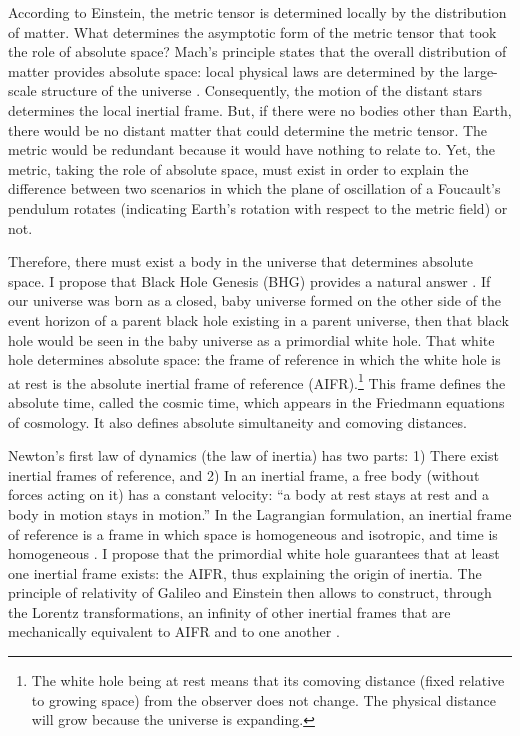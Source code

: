 \documentclass[prl,twocolumn,nofootinbib]{revtex4}
\begin{document}
According to Einstein, the metric tensor is determined locally by the distribution of matter.
What determines the asymptotic form of the metric tensor that took the role of absolute space?
Mach's principle states that the overall distribution of matter provides absolute space: local physical laws are determined by the large-scale structure of the universe \cite{Mach}.
Consequently, the motion of the distant stars determines the local inertial frame.
But, if there were no bodies other than Earth, there would be no distant matter that could determine the metric tensor.
The metric would be redundant because it would have nothing to relate to.
Yet, the metric, taking the role of absolute space, must exist in order to explain the difference between two scenarios in which the plane of oscillation of a Foucault’s pendulum rotates (indicating Earth's rotation with respect to the metric field) or not.

Therefore, there must exist a body in the universe that determines absolute space.
I propose that Black Hole Genesis (BHG) provides a natural answer \cite{ApJ}.
If our universe was born as a closed, baby universe \cite{BHG} formed on the other side of the event horizon of a parent black hole existing in a parent universe, then that black hole would be seen in the baby universe as a primordial white hole.
That white hole determines absolute space: the frame of reference in which the white hole is at rest is the absolute inertial frame of reference (AIFR).\footnote{
The white hole being at rest means that its comoving distance (fixed relative to growing space) from the observer does not change.
The physical distance will grow because the universe is expanding.
}
This frame defines the absolute time, called the cosmic time, which appears in the Friedmann equations of cosmology.
It also defines absolute simultaneity and comoving distances.

Newton's first law of dynamics (the law of inertia) has two parts: 1) There exist inertial frames of reference, and 2) In an inertial frame, a free body (without forces acting on it) has a constant velocity: “a body at rest stays at rest and a body in motion stays in motion.”
In the Lagrangian formulation, an inertial frame of reference is a frame in which space is homogeneous and isotropic, and time is homogeneous \cite{LL1}.
I propose that the primordial white hole guarantees that at least one inertial frame exists: the AIFR, thus explaining the origin of inertia.
The principle of relativity of Galileo and Einstein then allows to construct, through the Lorentz transformations, an infinity of other inertial frames that are mechanically equivalent to AIFR and to one another \cite{LL2}.
\end{document}

